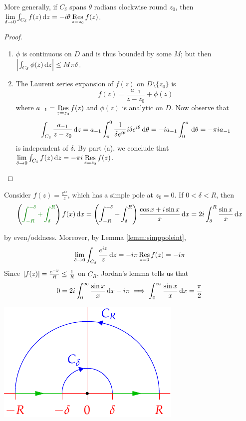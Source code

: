 More generally, if $C_\delta$ spans $\theta$ radians clockwise round $z_0$, then $\lim\limits_{\delta\to 0}\int_{C_\delta}f(z)\,{\mathrm{d} z}=-i\theta\operatorname*{Res}\limits_{z=z_0}f(z)$.

\begin{proof}
	\begin{enumerate}
	  \item $\phi$ is continuous on $D$ and is thus bounded by some $M$; but then $\left| \int_{C_\delta}\phi(z)\,{\mathrm{d} z}\right|\le M\pi \delta$.
		\item The Laurent series expansion of $f(z)$ on $D\setminus\{z_0\}$ is
		\[
			f(z)=\frac{a_{-1}}{z-z_0}+\phi(z)
		\]
		where $a_{-1}=\operatorname*{Res}\limits_{z=z_0}f(z)$ and $\phi(z)$ is analytic on $D$. Now observe that
		\[
			\int_{C_\delta}\frac{a_{-1}}{z-z_0}\,{\mathrm{d} z}=a_{-1}\int_{\pi}^0\frac 1{\delta e^{i\theta}}i\delta e^{i\theta}\,{\mathrm{d}\theta} =- ia_{-1}\int_{0}^\pi\,{\mathrm{d}\theta}=-\pi ia_{-1}
		\]
		is independent of $\delta$. By part (a), we conclude that $\lim\limits_{\delta\to 0}\int_{C_\delta}f(z)\,{\mathrm{d} z}=-\pi i\operatorname*{Res}\limits_{z=z_0}f(z)$.\qedhere
	\end{enumerate}
\end{proof}

\begin{example}{}{}
	Consider $f(z)=\frac{e^{iz}}z$, which has a simple pole at $z_0=0$. If $0<\delta<R$, then
	\[
		\left(\textcolor{Green}{\int_{-R}^{-\delta}+\int_\delta^R}\right)f(x)\,\dx
		=\left(\int_{-R}^{-\delta}+\int_\delta^R\right)\frac{\cos x+i\sin x}{x}\,\dx
		=2i\int_\delta^R\frac{\sin x}x\,\dx
	\]
	
	\begin{minipage}[t]{0.59\linewidth}\vspace{0pt}
		by even/oddness. Moreover, by Lemma \ref{lemm:simppoleint},
		\[
			\lim_{\delta\to 0}\int_{C_\delta}\frac{e^{iz}}z\,{\mathrm{d} z}
			=-i\pi\operatorname*{Res}_{z=0}f(z)=-i\pi
		\]
		Since $\left| f(z)\right|=\frac{e^{-y}}R\le \frac 1R$ on $C_R$, Jordan's lemma tells us that
		\[
			0=2i\int_0^\infty\frac{\sin x}x\,{\mathrm{d} x}-i\pi
			\implies \int_0^\infty\frac{\sin x}x\,{\mathrm{d} x}=\frac\pi 2
		\]
	\end{minipage}
	\hfill
	\begin{minipage}[t]{0.4\linewidth}\vspace{0pt}
		\flushright\includegraphics[scale=0.95]{integral6}
	\end{minipage}
\end{example}

